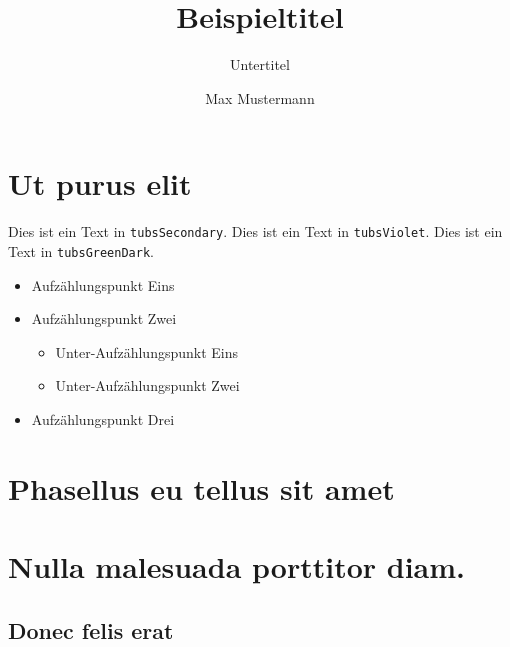 \documentclass[%
  a4paper,%
  11pt,%
  blue,%
  ]{tubsbook}
\title{Beispieltitel}
\subtitle{Untertitel}
\author{Max Mustermann}
\begin{document}
\maketitle[image,logo=right]%
\makebackpage[trisec]%

\tableofcontents


\chapter{Ut purus elit}

\textcolor{tubsSecondary}{Dies ist ein Text in \texttt{tubsSecondary}.}
\textcolor{tubsViolet}{Dies ist ein Text in \texttt{tubsViolet}.}
\textcolor{tubsGreenDark}{Dies ist ein Text in \texttt{tubsGreenDark}.}\bigskip

\lipsum[1]

\begin{itemize}
  \item Aufzählungspunkt Eins
  \item Aufzählungspunkt Zwei
    \begin{itemize}
      \item Unter-Aufzählungspunkt Eins
      \item Unter-Aufzählungspunkt Zwei
    \end{itemize}
  \item Aufzählungspunkt Drei
\end{itemize}

\lipsum[9-17]

\chapter{Phasellus eu tellus sit amet}

\lipsum[2-5]

\chapter{Nulla malesuada porttitor diam.}

\lipsum[1-3]

\section{Donec felis erat}

\lipsum[4-7]
\end{document}
